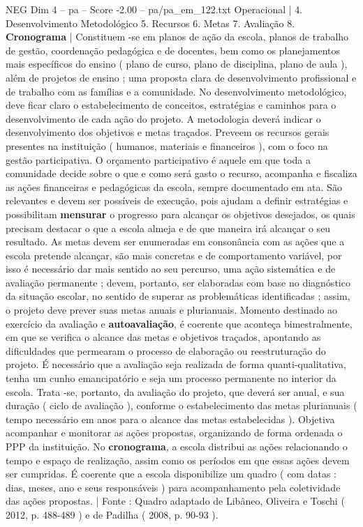 \begin{textsample}{NEG Dim 4 – pa – Score -2.00 – pa/pa\_em\_122.txt}
Operacional | 4.
Desenvolvimento Metodológico 5.
Recursos 6.
Metas 7.
Avaliação 8. \textbf{Cronograma} | Constituem -se em planos de ação da escola, planos de trabalho de gestão, coordenação pedagógica e de docentes, bem como os planejamentos mais específicos do ensino ( plano de curso, plano de disciplina, plano de aula ), além de projetos de ensino ; uma proposta clara de desenvolvimento profissional e de trabalho com as famílias e a comunidade.
No desenvolvimento metodológico, deve ficar claro o estabelecimento de conceitos, estratégias e caminhos para o desenvolvimento de cada ação do projeto.
A metodologia deverá indicar o desenvolvimento dos objetivos e metas traçados.
Preveem os recursos gerais presentes na instituição ( humanos, materiais e financeiros ), com o foco na gestão participativa.
O orçamento participativo é aquele em que toda a comunidade decide sobre o que e como será gasto o recurso, acompanha e fiscaliza as ações financeiras e pedagógicas da escola, sempre documentado em ata.
São relevantes e devem ser possíveis de execução, pois ajudam a definir estratégias e possibilitam \textbf{mensurar} o progresso para alcançar os objetivos desejados, os quais precisam destacar o que a escola almeja e de que maneira irá alcançar o seu resultado.
As metas devem ser enumeradas em consonância com as ações que a escola pretende alcançar, são mais concretas e de comportamento variável, por isso é necessário dar mais sentido ao seu percurso, uma ação sistemática e de avaliação permanente ; devem, portanto, ser elaboradas com base no diagnóstico da situação escolar, no sentido de superar as problemáticas identificadas ; assim, o projeto deve prever suas metas anuais e plurianuais.
Momento destinado ao exercício da avaliação e \textbf{autoavaliação}, é coerente que aconteça bimestralmente, em que se verifica o alcance das metas e objetivos traçados, apontando as dificuldades que permearam o processo de elaboração ou reestruturação do projeto.
É necessário que a avaliação seja realizada de forma quanti-qualitativa, tenha um cunho emancipatório e seja um processo permanente no interior da escola.
Trata -se, portanto, da avaliação do projeto, que deverá ser anual, e sua duração ( ciclo de avaliação ), conforme o estabelecimento das metas plurianuais ( tempo necessário em anos para o alcance das metas estabelecidas ).
Objetiva acompanhar e monitorar as ações propostas, organizando de forma ordenada o PPP da instituição.
No \textbf{cronograma}, a escola distribui as ações relacionando o tempo e espaço de realização, assim como os períodos em que essas ações devem ser cumpridas.
É coerente que a escola disponibilize um quadro ( com datas : dias, meses, ano e seus responsáveis ) para acompanhamento pela coletividade das ações propostas. | Fonte : Quadro adaptado de Libâneo, Oliveira e Toschi ( 2012, p. 488-489 ) e de Padilha ( 2008, p. 90-93 ).

\end{textsample}
